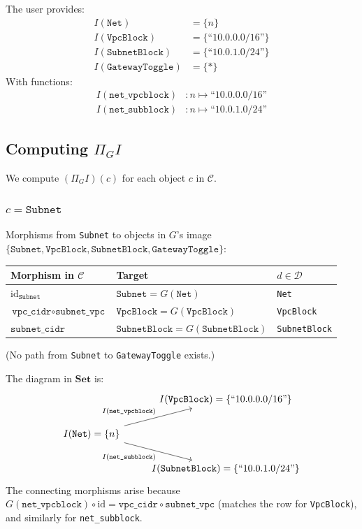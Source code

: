 \documentclass[11pt,a4paper]{article}
\theoremstyle{definition}
\theoremstyle{plain}
\newcommand{\Set}{\mathbf{Set}}
\newcommand{\id}{\mathrm{id}}
\begin{document}
The user provides:
\begin{align*}
I(\texttt{Net})           &= \{ n \} \\
I(\texttt{VpcBlock})      &= \{ \text{``10.0.0.0/16''} \} \\
I(\texttt{SubnetBlock})   &= \{ \text{``10.0.1.0/24''} \} \\
I(\texttt{GatewayToggle}) &= \{ * \}
\end{align*}
With functions:
\begin{align*}
I(\texttt{net\_vpcblock}) &\colon n \mapsto \text{``10.0.0.0/16''} \\
I(\texttt{net\_subblock}) &\colon n \mapsto \text{``10.0.1.0/24''}
\end{align*}

\subsection{Computing \texorpdfstring{$\Pi_G I$}{Pi\_G I}}

We compute $(\Pi_G I)(c)$ for each object $c$ in $\mathcal{C}$.

\subsubsection*{$c = \texttt{Subnet}$}

Morphisms from \texttt{Subnet} to objects in $G$'s image $\{\texttt{Subnet}, \texttt{VpcBlock}, \texttt{SubnetBlock}, \texttt{GatewayToggle}\}$:
\begin{center}
\begin{tabular}{lll}
\toprule
Morphism in $\mathcal{C}$ & Target & $d \in \mathcal{D}$ \\
\midrule
$\id_{\texttt{Subnet}}$ & $\texttt{Subnet} = G(\texttt{Net})$ & \texttt{Net} \\
$\texttt{vpc\_cidr} \circ \texttt{subnet\_vpc}$ & $\texttt{VpcBlock} = G(\texttt{VpcBlock})$ & \texttt{VpcBlock} \\
$\texttt{subnet\_cidr}$ & $\texttt{SubnetBlock} = G(\texttt{SubnetBlock})$ & \texttt{SubnetBlock} \\
\bottomrule
\end{tabular}
\end{center}
(No path from \texttt{Subnet} to \texttt{GatewayToggle} exists.)

The diagram in $\Set$ is:
\[
\begin{tikzcd}
& I(\texttt{VpcBlock}) = \{\text{``10.0.0.0/16''}\} \\
I(\texttt{Net}) = \{n\} \arrow[ru, "I(\texttt{net\_vpcblock})"] \arrow[rd, "I(\texttt{net\_subblock})"'] \\
& I(\texttt{SubnetBlock}) = \{\text{``10.0.1.0/24''}\}
\end{tikzcd}
\]
The connecting morphisms arise because $G(\texttt{net\_vpcblock}) \circ \id = \texttt{vpc\_cidr} \circ \texttt{subnet\_vpc}$ (matches the row for \texttt{VpcBlock}), and similarly for \texttt{net\_subblock}.
\end{document}
